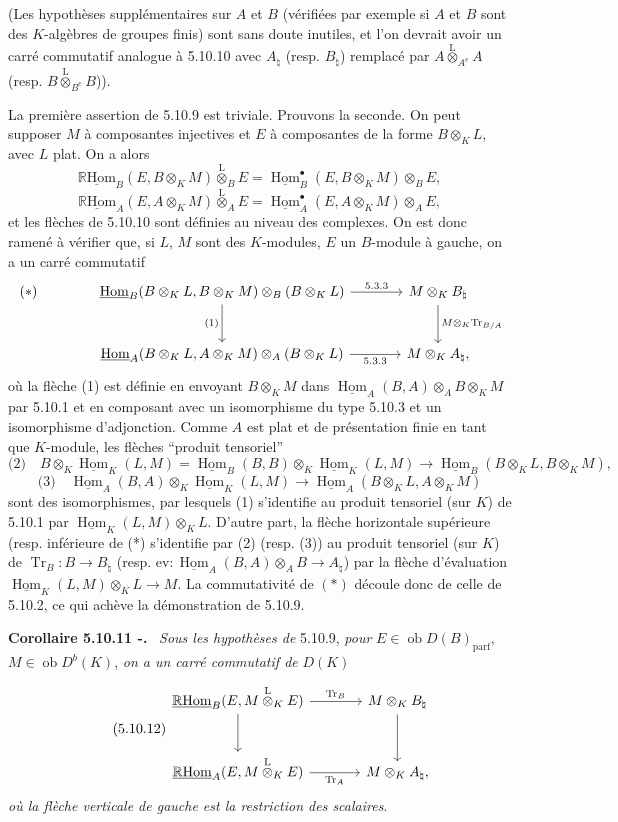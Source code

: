 \documentclass[11pt]{article}
\newenvironment{statement}[1]{\par\medskip\noindent\textbf{#1.}\ }{\par\medskip}
\DeclareMathOperator{\Hom}{Hom}
\newcommand{\R}{\mathbb{R}}\newcommand{\RHomCore}{\mathbb{R}\mathrm{Hom}}
\newcommand{\ob}{\operatorname{ob}}
\providecommand{\RHom}{\RHomCore}
\providecommand{\uRHom}{\underline{\RHom}}
\providecommand{\uHom}{\underline{\Hom}}
\providecommand{\Tr}{\operatorname{Tr}}
\providecommand{\Tr}{\operatorname{Tr}}
\providecommand{\lten}{\overset{\mathrm L}{\otimes}}
\providecommand{\Tr}{\operatorname{Tr}}
\providecommand{\RHom}{\RHomCore}
\providecommand{\Hom}{\operatorname{Hom}}
\providecommand{\ob}{\operatorname{ob}}
\providecommand{\lten}{\overset{\mathrm L}{\otimes}}
\providecommand{\RHom}{\R\mathcal{H}om}
\providecommand{\lten}{\overset{\mathrm L}{\otimes}}
\providecommand{\R}{\mathrm R}
\providecommand{\Tr}{\operatorname{Tr}}
\providecommand{\lten}{\overset{\mathrm L}{\otimes}}
\providecommand{\lten}{\overset{\mathrm L}{\otimes}}
\providecommand{\lten}{\overset{\mathrm L}{\otimes}}
\providecommand{\RHom}{\RHomCore}
\providecommand{\Hom}{\operatorname{Hom}}
\providecommand{\Tr}{\operatorname{Tr}}
\providecommand{\lten}{\overset{\mathrm L}{\otimes}}
\begin{document}
(Les hypothèses supplémentaires sur $A$ et $B$ (vérifiées par exemple si $A$ et $B$ sont des $K$-algèbres de groupes finis) sont sans doute inutiles, et l'on devrait avoir un carré commutatif analogue à 5.10.10 avec $A_\natural$ (resp. $B_\natural$) remplacé par $A\lten_{A^e}A$ (resp. $B\lten_{B^e}B$)).

La première assertion de 5.10.9 est triviale. Prouvons la seconde. On peut supposer $M$ à composantes injectives et $E$ à composantes de la forme $B\otimes_KL$, avec $L$ plat. On a alors
\[
\uRHom_B(E,B\otimes_KM)\lten_BE=\uHom_B^\bullet(E,B\otimes_KM)\otimes_BE,
\]
\[
\uRHom_A(E,A\otimes_KM)\lten_AE=\uHom_A^\bullet(E,A\otimes_KM)\otimes_AE,
\]
et les flèches de 5.10.10 sont définies au niveau des complexes. On est donc ramené à vérifier que, si $L$, $M$ sont des $K$-modules, $E$ un $B$-module à gauche, on a un carré commutatif
\[
\begin{tikzcd}[column sep=large,row sep=large]
|[alias=star]| {(*)} & \uHom_B(B\otimes_KL,B\otimes_KM)\otimes_B(B\otimes_KL) \arrow[r,"5.3.3"] \arrow[d,"(1)"'] & M\otimes_KB_\natural \arrow[d,"M\otimes_K\Tr_{B/A}"]\\
& \uHom_A(B\otimes_KL,A\otimes_KM)\otimes_A(B\otimes_KL) \arrow[r,"5.3.3"'] & M\otimes_KA_\natural,
\end{tikzcd}
\]
où la flèche (1) est définie en envoyant $B\otimes_KM$ dans $\uHom_A(B,A)\otimes_AB\otimes_KM$ par 5.10.1 et en composant avec un isomorphisme du type 5.10.3 et un isomorphisme d'adjonction. Comme $A$ est plat et de présentation finie en tant que $K$-module, les flèches ``produit tensoriel''
\[
\text{(2)}\quad B\otimes_K\uHom_K(L,M)=\uHom_B(B,B)\otimes_K\uHom_K(L,M)\to\uHom_B(B\otimes_KL,B\otimes_KM),
\]
\[
\text{(3)}\quad \uHom_A(B,A)\otimes_K\uHom_K(L,M)\to\uHom_A(B\otimes_KL,A\otimes_KM)
\]
sont des isomorphismes, par lesquels (1) s'identifie au produit tensoriel (sur $K$) de 5.10.1 par $\uHom_K(L,M)\otimes_KL$. D'autre part, la flèche horizontale supérieure (resp. inférieure de (*) s'identifie par (2) (resp. (3)) au produit tensoriel (sur $K$)
de $\Tr_B:B\to B_\natural$ (resp. $\mathrm{ev}:\uHom_A(B,A)\otimes_AB\to A_\natural$) par la flèche d'évaluation $\uHom_K(L,M)\otimes_KL\to M$. La commutativité de $(*)$ découle donc de celle de 5.10.2, ce qui achève la démonstration de 5.10.9.

\begin{statement}{Corollaire 5.10.11 -}
\emph{Sous les hypothèses de} 5.10.9, \emph{pour} $E\in\ob D(B)_{\mathrm{parf}}$, $M\in\ob D^b(K)$, \emph{on a un carré commutatif de} $D(K)$
\begin{equation}\tag{5.10.12}
\begin{tikzcd}[column sep=large,row sep=large]
\uRHom_B(E,M\lten_KE) \arrow[r,"\Tr_B"] \arrow[d] & M\otimes_KB_\natural \arrow[d]\\
\uRHom_A(E,M\lten_KE) \arrow[r,"\Tr_A"'] & M\otimes_KA_\natural,
\end{tikzcd}
\end{equation}
\emph{où la flèche verticale de gauche est la restriction des scalaires}.
\end{statement}
\end{document}
